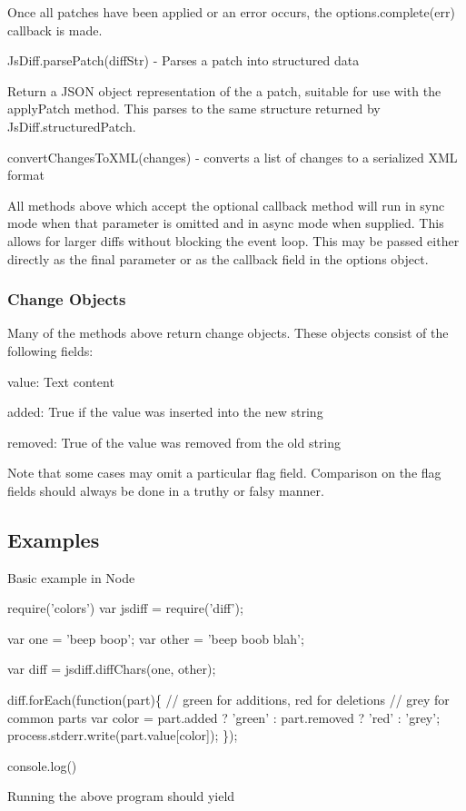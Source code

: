 \begin{DoxyItemize}
Once all patches have been applied or an error occurs, the {\ttfamily options.\+complete(err)} callback is made.
\item {\ttfamily Js\+Diff.\+parse\+Patch(diff\+Str)} -\/ Parses a patch into structured data

Return a J\+S\+ON object representation of the a patch, suitable for use with the {\ttfamily apply\+Patch} method. This parses to the same structure returned by {\ttfamily Js\+Diff.\+structured\+Patch}.
\item {\ttfamily convert\+Changes\+To\+X\+M\+L(changes)} -\/ converts a list of changes to a serialized X\+ML format
\end{DoxyItemize}

All methods above which accept the optional {\ttfamily callback} method will run in sync mode when that parameter is omitted and in async mode when supplied. This allows for larger diffs without blocking the event loop. This may be passed either directly as the final parameter or as the {\ttfamily callback} field in the {\ttfamily options} object.

\subsubsection*{Change Objects}

Many of the methods above return change objects. These objects consist of the following fields\+:


\begin{DoxyItemize}
\item {\ttfamily value}\+: Text content
\item {\ttfamily added}\+: True if the value was inserted into the new string
\item {\ttfamily removed}\+: True of the value was removed from the old string
\end{DoxyItemize}

Note that some cases may omit a particular flag field. Comparison on the flag fields should always be done in a truthy or falsy manner.

\subsection*{Examples}

Basic example in Node


\begin{DoxyCode}
require('colors')
var jsdiff = require('diff');

var one = 'beep boop';
var other = 'beep boob blah';

var diff = jsdiff.diffChars(one, other);

diff.forEach(function(part)\{
  // green for additions, red for deletions
  // grey for common parts
  var color = part.added ? 'green' :
    part.removed ? 'red' : 'grey';
  process.stderr.write(part.value[color]);
\});

console.log()
\end{DoxyCode}
 Running the above program should yield



